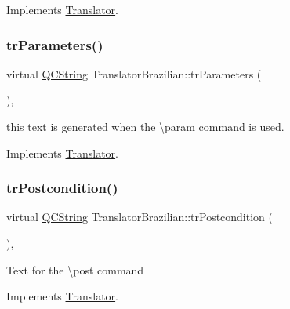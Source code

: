 Implements \mbox{\hyperlink{class_translator}{Translator}}.

\mbox{\label{class_translator_brazilian_ae2cc1b73a54d23bc5b898dae2292c210}} 
\subsubsection{\texorpdfstring{trParameters()}{trParameters()}}
{\footnotesize\ttfamily virtual \mbox{\hyperlink{class_q_c_string}{Q\+C\+String}} Translator\+Brazilian\+::tr\+Parameters (\begin{DoxyParamCaption}{ }\end{DoxyParamCaption})\hspace{0.3cm}{\ttfamily [inline]}, {\ttfamily [virtual]}}

this text is generated when the \textbackslash{}param command is used. 

Implements \mbox{\hyperlink{class_translator}{Translator}}.

\mbox{\label{class_translator_brazilian_a8978f77933c2abc6787ab09de8248f63}} 
\subsubsection{\texorpdfstring{trPostcondition()}{trPostcondition()}}
{\footnotesize\ttfamily virtual \mbox{\hyperlink{class_q_c_string}{Q\+C\+String}} Translator\+Brazilian\+::tr\+Postcondition (\begin{DoxyParamCaption}{ }\end{DoxyParamCaption})\hspace{0.3cm}{\ttfamily [inline]}, {\ttfamily [virtual]}}

Text for the \textbackslash{}post command 

Implements \mbox{\hyperlink{class_translator}{Translator}}.

\mbox{\label{class_translator_brazilian_ade2cfeca5ab289969c0261c42ebe932e}} 

